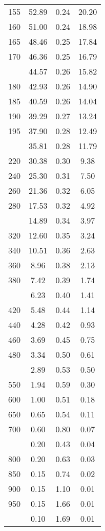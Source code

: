 \begin{table}[ht]
\begin{tabular}{lccc}
  155 & 52.89 & 0.24 & 20.20 \\ 
  160 & 51.00 & 0.24 & 18.98 \\ 
  165 & 48.46 & 0.25 & 17.84 \\ 
  170 & 46.36 & 0.25 & 16.79 \\ 
   \addlinespace
175 & 44.57 & 0.26 & 15.82 \\ 
  180 & 42.93 & 0.26 & 14.90 \\ 
  185 & 40.59 & 0.26 & 14.04 \\ 
  190 & 39.29 & 0.27 & 13.24 \\ 
  195 & 37.90 & 0.28 & 12.49 \\ 
   \addlinespace
200 & 35.81 & 0.28 & 11.79 \\ 
  220 & 30.38 & 0.30 & 9.38 \\ 
  240 & 25.30 & 0.31 & 7.50 \\ 
  260 & 21.36 & 0.32 & 6.05 \\ 
  280 & 17.53 & 0.32 & 4.92 \\ 
   \addlinespace
300 & 14.89 & 0.34 & 3.97 \\ 
  320 & 12.60 & 0.35 & 3.24 \\ 
  340 & 10.51 & 0.36 & 2.63 \\ 
  360 & 8.96 & 0.38 & 2.13 \\ 
  380 & 7.42 & 0.39 & 1.74 \\ 
   \addlinespace
400 & 6.23 & 0.40 & 1.41 \\ 
  420 & 5.48 & 0.44 & 1.14 \\ 
  440 & 4.28 & 0.42 & 0.93 \\ 
  460 & 3.69 & 0.45 & 0.75 \\ 
  480 & 3.34 & 0.50 & 0.61 \\ 
   \addlinespace
500 & 2.89 & 0.53 & 0.50 \\ 
  550 & 1.94 & 0.59 & 0.30 \\ 
  600 & 1.00 & 0.51 & 0.18 \\ 
  650 & 0.65 & 0.54 & 0.11 \\ 
  700 & 0.60 & 0.80 & 0.07 \\ 
   \addlinespace
750 & 0.20 & 0.43 & 0.04 \\ 
  800 & 0.20 & 0.63 & 0.03 \\ 
  850 & 0.15 & 0.74 & 0.02 \\ 
  900 & 0.15 & 1.10 & 0.01 \\ 
  950 & 0.15 & 1.66 & 0.01 \\ 
   \addlinespace
1000 & 0.10 & 1.69 & 0.01 \\ 
   \bottomrule
\end{tabular}
\end{table}
